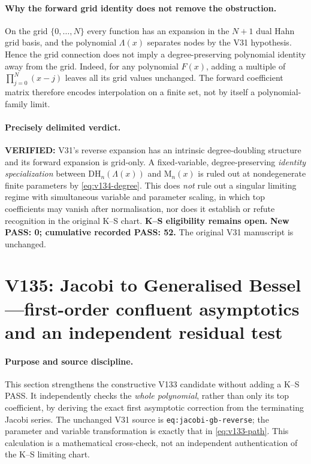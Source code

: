 \documentclass[11pt]{article}
\begin{document}
\paragraph{Why the forward grid identity does not remove the obstruction.}
On the grid $\{0,\ldots,N\}$ every function has an expansion in the
$N+1$ dual Hahn grid basis, and the polynomial $\Lambda(x)$ separates
nodes by the V31 hypothesis.  Hence the grid connection does not imply
a degree-preserving polynomial identity away from the grid.  Indeed,
for any polynomial $F(x)$, adding a multiple of
$\prod_{j=0}^N(x-j)$ leaves all its grid values unchanged.  The
forward coefficient matrix therefore encodes interpolation on a finite
set, not by itself a polynomial-family limit.

\paragraph{Precisely delimited verdict.}
\textbf{VERIFIED:} V31's reverse expansion has an intrinsic degree-doubling
structure and its forward expansion is grid-only.  A fixed-variable,
degree-preserving \emph{identity specialization} between
$\mathrm{DH}_n(\Lambda(x))$ and $\mathrm M_n(x)$ is ruled out at
nondegenerate finite parameters by \eqref{eq:v134-degree}.  This does
\emph{not} rule out a singular limiting regime with simultaneous variable
and parameter scaling, in which top coefficients may vanish after
normalisation, nor does it establish or refute recognition in the original
K--S chart.  \textbf{K--S eligibility remains open.}
\textbf{New PASS: 0; cumulative recorded PASS: 52.}
The original V31 manuscript is unchanged.


\clearpage
\section{V135: Jacobi to Generalised Bessel---first-order confluent asymptotics and an independent residual test}
\label{sec:v135-jacobi-bessel-first-order}

\paragraph{Purpose and source discipline.}
This section strengthens the constructive V133 candidate without adding a
K--S PASS.  It independently checks the \emph{whole polynomial}, rather than
only its top coefficient, by deriving the exact first asymptotic correction
from the terminating Jacobi series.  The unchanged V31 source is
\texttt{eq:jacobi-gb-reverse}; the parameter and variable transformation
is exactly that in \eqref{eq:v133-path}.  This calculation is a mathematical
cross-check, not an independent authentication of the K--S limiting chart.
\end{document}
